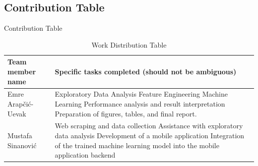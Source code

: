 \documentclass{beamer}
\begin{document}
    \subsection{Contribution Table}
      \begin{frame}{Contribution Table}
        \begin{table}[H]
            \centering
            \renewcommand{\arraystretch}{1.3}
            \begin{tabularx}{\textwidth}{|l|X|}
                \hline
                \textbf{Team member name} & \textbf{Specific tasks completed (should not be ambiguous)} \\
                \hline
                Emre Arap\v{c}i\'{c}-Uevak &
                Exploratory Data Analysis  \newline
                Feature Engineering  \newline
                Machine Learning  \newline
                Performance analysis and result interpretation \newline
                Preparation of figures, tables, and final report. \\
                \hline
                Mustafa Sinanovi\'{c} &
                Web scraping and data collection \newline
                Assistance with exploratory data analysis \newline
                Development of a mobile application \newline
                Integration of the trained machine learning model into the mobile application backend \\
                \hline
            \end{tabularx}
            \caption{Work Distribution Table}
            \label{tab:work dist}
        \end{table}
      \end{frame}
  
\end{document}
